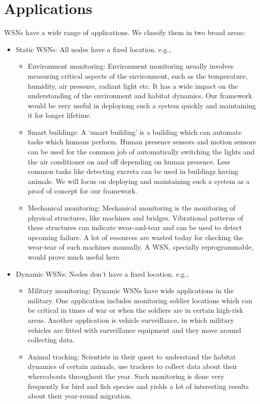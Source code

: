 \documentclass[twocolumn]{article}
\begin{document}
\section{Applications}
WSNs have a wide range of applications. We classify them in two broad areas:
\begin{itemize}
\item Static WSNs: All nodes have a fixed location. e.g.,\
\begin{itemize}
\item Environment monitoring\cite{culler2004guest}: Environment monitoring usually involves measuring critical aspects of the environment, such as the temperature, humidity, air pressure, radiant light etc. It has a wide impact on the understanding of the environment and habitat dynamics. Our framework would be very useful in deployiong such a system quickly and maintaining it for longer lifetime.
\item Smart buildings\cite{chen2009design}: A `smart building' is a building which can automate tasks which humans perform. Human presence sensors and motion sensors can be used for the common job of automatically switching the lights and the air conditioner on and off depending on human presence. Less common tasks like detecting excreta can be used in buildings having animals. We will focus on deploying and maintaining such a system as a proof of concept for our framework.
\item Mechanical monitoring\cite{kim2006wireless}: Mechanical monitoring is the monitoring of physical structures, like machines and bridges. Vibrational patterns of these structures can indicate wear-and-tear and can be used to detect upcoming failure. A lot of resources are wasted today for checking the wear-tear of such machines manually. A WSN, specially reprogrammable, would prove much useful here.
\end{itemize}
\item Dynamic WSNs: Nodes don't have a fixed location. e.g.,\
\begin{itemize}
\item Military monitoring\cite{akyildiz2007wireless}: Dynamic WSNs have wide applications in the military. One application includes monitoring soldier locations which can be critical in times of war or when the soldiers are in certain high-risk areas. Another application is vehicle surveillance, in which military vehicles are fitted with surveillance equipment and they move around collecting data.
\item Animal tracking\cite{sikka2004wireless}: Scientists in their quest to understand the habitat dynamics of certain animals, use trackers to collect data about their whereabouts throughout the year. Such monitoring is done very frequently for bird and fish species and yields a lot of interesting results about their year-round migration.

\end{itemize}
\end{itemize}
\end{document}

